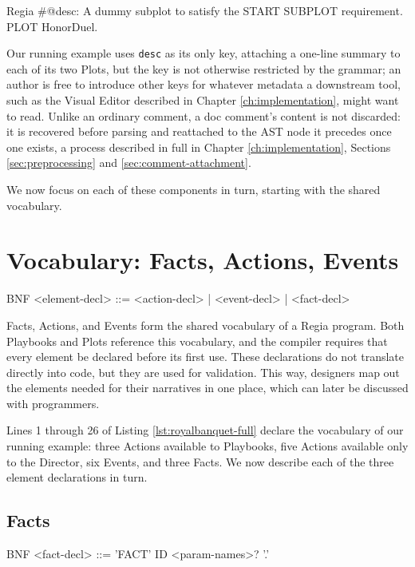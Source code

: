 \begin{codeblock}[]{Regia}
#@desc: A dummy subplot to satisfy the START SUBPLOT requirement.
PLOT HonorDuel.
\end{codeblock}

Our running example uses \lstinline|desc| as its only key, attaching a one-line summary to each of its two Plots, but the key is not otherwise restricted by the grammar; an author is free to introduce other keys for whatever metadata a downstream tool, such as the Visual Editor described in Chapter \ref{ch:implementation}, might want to read. Unlike an ordinary comment, a doc comment's content is not discarded: it is recovered before parsing and reattached to the AST node it precedes once one exists, a process described in full in Chapter \ref{ch:implementation}, Sections \ref{sec:preprocessing} and \ref{sec:comment-attachment}.

We now focus on each of these components in turn, starting with the shared vocabulary.

\section{Vocabulary: Facts, Actions, Events}
\label{sec:vocabulary}
\begin{codeblock}[]{BNF}
    <element-decl>   ::= <action-decl>
                       | <event-decl>
                       | <fact-decl>
\end{codeblock}
Facts, Actions, and Events form the shared vocabulary of a Regia program. Both Playbooks and Plots reference this vocabulary, and the compiler requires that every element be declared before its first use. These declarations do not translate directly into code, but they are used for validation. This way, designers map out the elements needed for their narratives in one place, which can later be discussed with programmers.

Lines 1 through 26 of Listing \ref{lst:royalbanquet-full} declare the vocabulary of our running example: three Actions available to Playbooks, five Actions available only to the Director, six Events, and three Facts. We now describe each of the three element declarations in turn.

\subsection{Facts}
\begin{codeblock}[]{BNF}
    <fact-decl>      ::= 'FACT' ID <param-names>? '.'
\end{codeblock}

